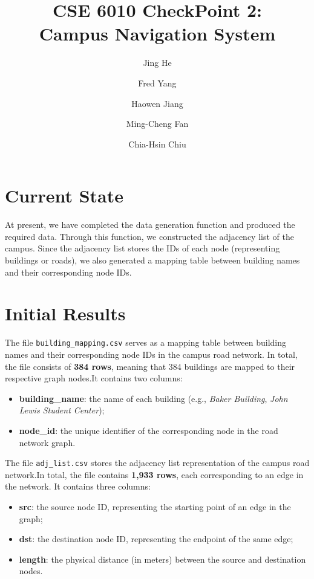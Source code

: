 \documentclass[fleqn,10pt]{olplainarticle}
\title{CSE 6010 CheckPoint 2: \\Campus Navigation System}
\author[1]{Jing He}
\author[2]{Fred Yang}
\author[3]{Haowen Jiang}
\author[4]{Ming-Cheng Fan}
\author[5]{Chia-Hsin Chiu}
\affil[1]{jhe468@gatech.edu}
\affil[2]{fred.yang@gatech.edu}
\affil[3]{hjiang401@gatech.edu}
\affil[4]{mfan77@gatech.edu}
\affil[5]{cchiu73@gatech.edu}
\begin{document}
\flushbottom
\maketitle


\section*{Current State}
At present, we have completed the data generation function and produced the required data. Through this function, we constructed the adjacency list of the campus. Since the adjacency list stores the IDs of each node (representing buildings or roads), we also generated a mapping table between building names and their corresponding node IDs.

\section*{Initial Results}
The file \texttt{building\_mapping.csv} serves as a mapping table between building names and their corresponding node IDs in the campus road network. In total, the file consists of \textbf{384 rows}, meaning that 384 buildings are mapped to their respective graph nodes.It contains two columns:

\begin{itemize}
    \item \textbf{building\_name}: the name of each building (e.g., \textit{Baker Building}, \textit{John Lewis Student Center});
    \item \textbf{node\_id}: the unique identifier of the corresponding node in the road network graph.
\end{itemize}

The file \texttt{adj\_list.csv} stores the adjacency list representation of the campus road network.In total, the file contains \textbf{1,933 rows}, each corresponding to an edge in the network. It contains three columns:

\begin{itemize}
    \item \textbf{src}: the source node ID, representing the starting point of an edge in the graph;
    \item \textbf{dst}: the destination node ID, representing the endpoint of the same edge;
    \item \textbf{length}: the physical distance (in meters) between the source and destination nodes.
\end{itemize}
\end{document}
